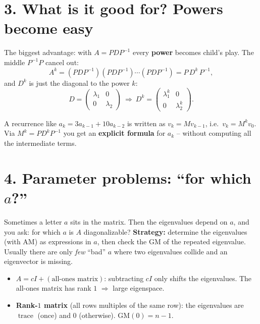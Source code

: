 \documentclass[a4paper,12pt]{article}
\newcommand{\EV}{eigenvector}
\begin{document}
\section*{3. What is it good for? Powers become easy}

The biggest advantage: with $A = P D P^{-1}$ every \textbf{power} becomes child's play. The middle $P^{-1}P$ cancel out:
\[
A^k = (PDP^{-1})(PDP^{-1})\cdots(PDP^{-1}) = P\,D^k\,P^{-1},
\]
and $D^k$ is just the diagonal to the power $k$:
\[
D = \begin{pmatrix} \lambda_1 & 0 \\ 0 & \lambda_2 \end{pmatrix} \ \Rightarrow\
D^k = \begin{pmatrix} \lambda_1^k & 0 \\ 0 & \lambda_2^k \end{pmatrix}.
\]

\begin{merkbox}[title={Application: sequences}]
A recurrence like $a_k = 3a_{k-1} + 10a_{k-2}$ is written as $v_k = M v_{k-1}$, i.e.\ $v_k = M^k v_0$. Via $M^k = P D^k P^{-1}$ you get an \textbf{explicit formula} for $a_k$ -- without computing all the intermediate terms.
\end{merkbox}

\section*{4. Parameter problems: ``for which $a$?''}

Sometimes a letter $a$ sits in the matrix. Then the eigenvalues depend on $a$, and you ask: for which $a$ is $A$ diagonalizable? \textbf{Strategy:} determine the eigenvalues (with AM) as expressions in $a$, then check the GM of the repeated eigenvalue. Usually there are only \emph{few} ``bad'' $a$ where two eigenvalues collide and an \EV{} is missing.

\begin{merkbox}[title={Two useful structures (from HW11)}]
\begin{itemize}[leftmargin=*, nosep]
    \item \textbf{$A = cI + (\text{all-ones matrix})$}: subtracting $cI$ only shifts the eigenvalues. The all-ones matrix has rank $1$ $\Rightarrow$ large eigenspace.
    \item \textbf{Rank-$1$ matrix} (all rows multiples of the same row): the eigenvalues are $\operatorname{trace}$ (once) and $0$ (otherwise). GM$(0) = n - 1$.
\end{itemize}
\end{merkbox}
\end{document}
